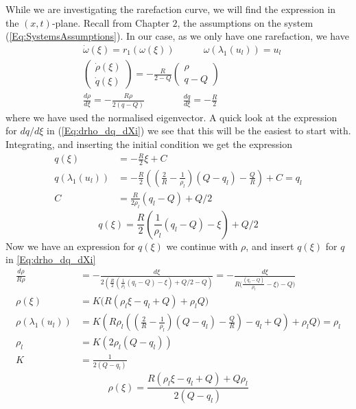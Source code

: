 \documentclass[10pt]{article}
\numberwithin{equation}{section}
\begin{document}
While we are investigating the rarefaction curve, we will find the expression in the $(x,t)$-plane. Recall from Chapter $2$, the assumptions on the system (\ref{Eq:SystemsAssumptions}). In our case, as we only have one rarefaction, we have 
\begin{align}
    & \dot \omega(\xi) = r_1( \omega(\xi))  \quad \quad \quad \omega(\lambda_1(u_l)) = u_l \nonumber \\
    &\begin{pmatrix} \dot \rho(\xi) \\ \dot q(\xi) \end{pmatrix} = - \frac{R}{2-Q}\begin{pmatrix}  \rho \\ q - Q\end{pmatrix} \nonumber\\
    & \frac{d\rho}{d\xi} = - \frac{R \rho}{2(q-Q)} \quad \quad  \quad \quad  \frac{dq}{d\xi} = -\frac{R}{2} \label{Eq:drho_dq_dXi}
\end{align}
where we have used the normalised eigenvector. A quick look at the expression for $dq/d\xi$ in (\ref{Eq:drho_dq_dXi}) we see that this will be the easiest to start with. Integrating, and inserting the initial condition we get the expression
\begin{align*}
    q(\xi) &= -\frac{R}{2}\xi + C \\
    q(\lambda_1(u_l)) &= -\frac{R}{2}((\frac{2}{R}- \frac{1}{\rho_l})(Q-q_l) -  \frac{Q}{R}) + C = q_l \\
    C &= \frac{R}{2\rho_l}(q_l - Q) + Q/2 
\end{align*}
\begin{equation}
    q(\xi) = \frac{R}{2}( \frac{1}{\rho_l}(q_l - Q) - \xi ) + Q/2 \label{Eq:q(xi)}
\end{equation}
Now we have an expression for $q(\xi)$ we continue with $\rho$, and insert $q(\xi)$ for $q$ in \ref{Eq:drho_dq_dXi}
\begin{align*}
    \frac{d\rho}{R \rho} &= -\frac{d \xi}{2( \frac{R}{2}( \frac{1}{\rho_l}(q_l - Q) - \xi ) + Q/2 -Q) } = -\frac{d \xi}{R \big( \frac{(q_l - Q) }{\rho_l}- \xi \big) -Q) }\\
                \rho(\xi) &= K \big( R (\rho_l \xi - q_l +Q) + \rho_l Q \big) \\
    \rho(\lambda_1(u_l)) &= K( R \rho_l ((\frac{2}{R}- \frac{1}{\rho_l})(Q-q_l) -  \frac{Q}{R}) - q_l +Q) + \rho_l Q) = \rho_l \\
    \rho_l &= K( 2 \rho_l (Q-q_l )) \\
    K &= \frac{1}{2(Q-q_l)}
\end{align*}
\begin{equation}
    \rho(\xi) = \frac{R(\rho_l \xi - q_l + Q) + Q \rho_l}{2(Q-q_l)} \label{Eq:rho(xi)}
\end{equation}
\end{document}
